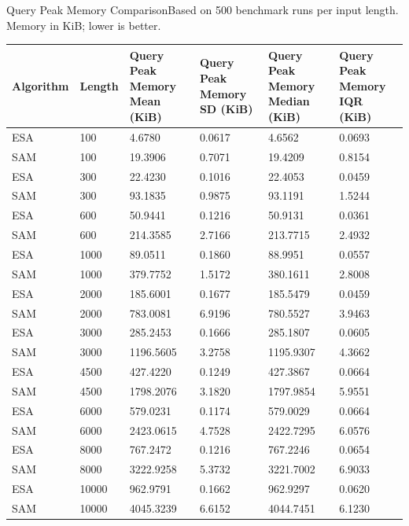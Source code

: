 \begin{benchmarktable}{Query Peak Memory Comparison}{Based on 500 benchmark runs per input length. Memory in KiB; lower is better.}
\begin{tabularx}{\textwidth}{|X|X|X|X|X|X|}
\toprule
Algorithm & Length & Query Peak Memory Mean (KiB) & Query Peak Memory SD (KiB) & Query Peak Memory Median (KiB) & Query Peak Memory IQR (KiB) \\
\midrule
ESA & 100 & 4.6780 & 0.0617 & 4.6562 & 0.0693 \\
SAM & 100 & 19.3906 & 0.7071 & 19.4209 & 0.8154 \\
\hline
ESA & 300 & 22.4230 & 0.1016 & 22.4053 & 0.0459 \\
SAM & 300 & 93.1835 & 0.9875 & 93.1191 & 1.5244 \\
\hline
ESA & 600 & 50.9441 & 0.1216 & 50.9131 & 0.0361 \\
SAM & 600 & 214.3585 & 2.7166 & 213.7715 & 2.4932 \\
\hline
ESA & 1000 & 89.0511 & 0.1860 & 88.9951 & 0.0557 \\
SAM & 1000 & 379.7752 & 1.5172 & 380.1611 & 2.8008 \\
\hline
ESA & 2000 & 185.6001 & 0.1677 & 185.5479 & 0.0459 \\
SAM & 2000 & 783.0081 & 6.9196 & 780.5527 & 3.9463 \\
\hline
ESA & 3000 & 285.2453 & 0.1666 & 285.1807 & 0.0605 \\
SAM & 3000 & 1196.5605 & 3.2758 & 1195.9307 & 4.3662 \\
\hline
ESA & 4500 & 427.4220 & 0.1249 & 427.3867 & 0.0664 \\
SAM & 4500 & 1798.2076 & 3.1820 & 1797.9854 & 5.9551 \\
\hline
ESA & 6000 & 579.0231 & 0.1174 & 579.0029 & 0.0664 \\
SAM & 6000 & 2423.0615 & 4.7528 & 2422.7295 & 6.0576 \\
\hline
ESA & 8000 & 767.2472 & 0.1216 & 767.2246 & 0.0654 \\
SAM & 8000 & 3222.9258 & 5.3732 & 3221.7002 & 6.9033 \\
\hline
ESA & 10000 & 962.9791 & 0.1662 & 962.9297 & 0.0620 \\
SAM & 10000 & 4045.3239 & 6.6152 & 4044.7451 & 6.1230 \\
\bottomrule
\end{tabularx}
\end{benchmarktable}

